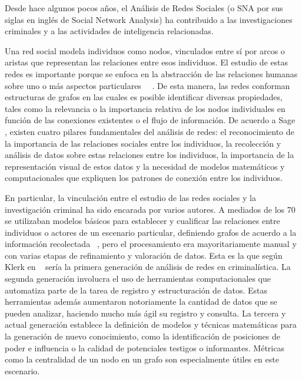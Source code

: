 
Desde hace algunos pocos años, el Análisis de Redes Sociales (o SNA por sus siglas en inglés de Social Network Analysis) ha contribuido a las investigaciones criminales y a las actividades de inteligencia relacionadas.

Una red social modela individuos como nodos, vinculados entre sí por arcos o aristas que representan las relaciones entre esos individuos. El estudio de estas redes es importante porque se enfoca en la abstracción de las relaciones humanas sobre uno o más aspectos particulares ~\cite{ref_article2}~\cite{ref_article3}. De esta manera, las redes conforman estructuras de grafos en las cuales es posible identificar diversas propiedades, tales como la relevancia o la importancia relativa de los nodos individuales en función de las conexiones existentes o el flujo de información. De acuerdo a Sage~\cite{ref_article4} , existen cuatro pilares fundamentales del análisis de redes: el reconocimiento de la importancia de las relaciones sociales entre los individuos, la recolección y análisis de datos sobre estas relaciones entre los individuos, la importancia de la representación visual de estos datos y la necesidad de modelos matemáticos y computacionales que expliquen los patrones de conexión entre los individuos.

En particular, la vinculación entre el estudio de las redes sociales y la investigación criminal ha sido encarada por varios autores. A mediados de los 70 se utilizaban modelos básicos para establecer y cualificar las relaciones entre individuos o actores de un escenario particular, definiendo grafos de acuerdo a la información recolectada ~\cite{ref_article5}, pero el procesamiento era mayoritariamente manual y con varias etapas de refinamiento y valoración de datos. Esta es la que según Klerk en ~\cite{ref_article6} sería la primera generación de análisis de redes en criminalística. La segunda generación involucra el uso de herramientas computacionales que automatiza parte de la tarea de registro y estructuración de datos. Estas herramientas además aumentaron notoriamente la cantidad de datos que se pueden analizar, haciendo mucho más ágil su registro y consulta. La tercera y actual generación establece la definición de modelos y técnicas matemáticas para la generación de nuevo conocimiento, como la identificación de posiciones de poder e influencia o la calidad de potenciales testigos o informantes. Métricas como la centralidad de un nodo en un grafo son especialmente útiles en este escenario.

